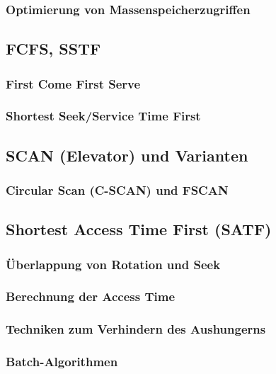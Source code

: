\subsubsection*{Optimierung von Massenspeicherzugriffen}

\subsection{FCFS, SSTF}
\subsubsection{First Come First Serve}

\subsubsection{Shortest Seek/Service Time First}

\subsection{SCAN (Elevator) und Varianten}

\subsubsection{Circular Scan (C-SCAN) und FSCAN}

\subsection{Shortest Access Time First (SATF)}
\subsubsection*{Überlappung von Rotation und Seek}
\subsubsection*{Berechnung der Access Time}
\subsubsection{Techniken zum Verhindern des Aushungerns}
\subsubsection*{Batch-Algorithmen}
